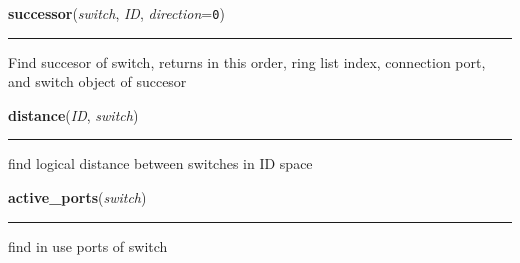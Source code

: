     \label{Data_Plane_DHT:successor}

    \vspace{0.5ex}

\hspace{.8\funcindent}\begin{boxedminipage}{\funcwidth}

    \raggedright \textbf{successor}(\textit{switch}, \textit{ID}, \textit{direction}={\tt 0})

    \vspace{-1.5ex}

    \rule{\textwidth}{0.5\fboxrule}
\setlength{\parskip}{2ex}
    Find succesor of switch, returns in this order, ring list index, 
    connection port, and switch object of succesor

\setlength{\parskip}{1ex}
    \end{boxedminipage}

    \label{Data_Plane_DHT:distance}

    \vspace{0.5ex}

\hspace{.8\funcindent}\begin{boxedminipage}{\funcwidth}

    \raggedright \textbf{distance}(\textit{ID}, \textit{switch})

    \vspace{-1.5ex}

    \rule{\textwidth}{0.5\fboxrule}
\setlength{\parskip}{2ex}
    find logical distance between switches in ID space

\setlength{\parskip}{1ex}
    \end{boxedminipage}

    \label{Data_Plane_DHT:active_ports}

    \vspace{0.5ex}

\hspace{.8\funcindent}\begin{boxedminipage}{\funcwidth}

    \raggedright \textbf{active\_ports}(\textit{switch})

    \vspace{-1.5ex}

    \rule{\textwidth}{0.5\fboxrule}
\setlength{\parskip}{2ex}
    find in use ports of switch

\setlength{\parskip}{1ex}
    \end{boxedminipage}

